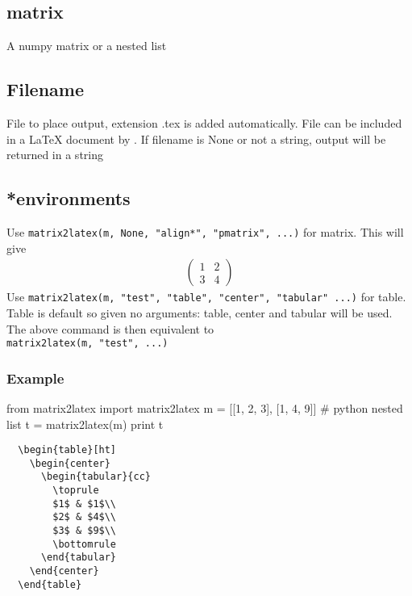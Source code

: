 \subsection{matrix}
  A numpy matrix or a nested list

\subsection{Filename}
  File to place output, extension .tex is added automatically. File can be included in a LaTeX
  document by \verb!!. If filename is None or not a string, output will be returned in a string
  
\subsection{*environments}
  Use 
\lstinline{matrix2latex(m, None, "align*", "pmatrix", ...)} for matrix.
  This will give
  \begin{align*}
    \begin{pmatrix}
      1 & 2 \\
      3 & 4
    \end{pmatrix}
  \end{align*}
  Use 
\lstinline{matrix2latex(m, "test", "table", "center", "tabular" ...)} for table.
  Table is default so given no arguments: table, center and tabular will be used.
  The above command is then equivalent to \\
\lstinline{matrix2latex(m, "test", ...)}

\subsubsection{Example}
\begin{sageblock}
  from matrix2latex import matrix2latex
  m = [[1, 2, 3], [1, 4, 9]] # python nested list
  t = matrix2latex(m)
  print t
\end{sageblock}
\begin{lstlisting}
  \begin{table}[ht]
    \begin{center}
      \begin{tabular}{cc}
        \toprule
        $1$ & $1$\\
        $2$ & $4$\\
        $3$ & $9$\\
        \bottomrule
      \end{tabular}
    \end{center}
  \end{table}
\end{lstlisting}

